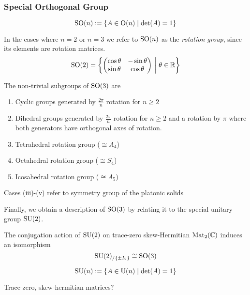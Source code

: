 \subsubsection{Special Orthogonal Group}
\begin{proposition}
   \[\operatorname{SO}(n) := \{A \in \operatorname{O}(n) \mid \det(A) = 1\}\]
\end{proposition}
\begin{remark}[Terminology]
   In the cases where \(n = 2\) or \(n = 3\) we refer to \(\operatorname{SO}(n)\) as the \emph{rotation group}, since its elements are rotation matrices.
   \[\operatorname{SO}(2) = \left\{\begin{pmatrix}\cos\theta & -\sin\theta\\ \sin\theta & \cos\theta\end{pmatrix} ~\middle|~ \theta \in \mathbb{R}\right\}\]
\end{remark}

\begin{theorem}
   The non-trivial subgroups of \(\operatorname{SO}(3)\) are
   \begin{enumerate}[label=\roman*, align=Center]
      \item Cyclic groups generated by \(\frac{2\pi}{n}\) rotation for \(n \geq 2\)
      \item Dihedral groups generated by \(\frac{2\pi}{n}\) rotation for \(n \geq 2\) and a rotation by \(\pi\) where both generators have orthogonal axes of rotation.
      \item Tetrahedral rotation group (\(\cong A_4\))
      \item Octahedral rotation group (\(\cong S_4\))
      \item Icosahedral rotation group (\(\cong A_5\))
   \end{enumerate}
\end{theorem}
\begin{remark}
   Cases (iii)-(v) refer to symmetry group of the platonic solids
\end{remark}

Finally, we obtain a description of \(\operatorname{SO}(3)\) by relating it to the special unitary group \(\operatorname{SU}(2)\).

\begin{proposition}
   The conjugation action of \(\operatorname{SU}(2)\) on trace-zero skew-Hermitian \(\operatorname{Mat}_2(\mathbb{C})\) induces an isomorphism
   \[\operatorname{SU}(2)_{/\{\pm I_2\}} \cong \operatorname{SO}(3)\]
\end{proposition}

\begin{proposition}
   \[\operatorname{SU}(n) := \{A \in \operatorname{U}(n) \mid \det(A) = 1\}\]
\end{proposition}
\begin{remark}
   Trace-zero, skew-hermitian matrices?
\end{remark}

